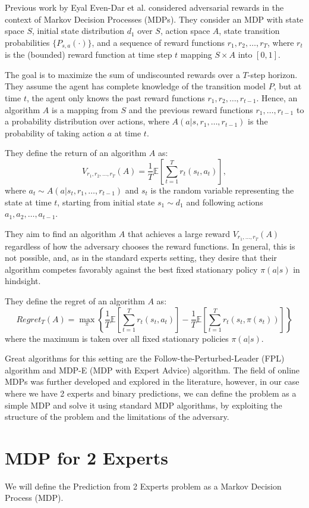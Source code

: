 \documentclass[a4paper, 12pt]{article}
\begin{document}
Previous work by Eyal Even-Dar et al. considered adversarial rewards in the context of Markov Decision Processes (MDPs).
They consider an MDP with state space $S$, initial state distribution $d_1$ over $S$, action space $A$, 
state transition probabilities $\{P_{s,a}(\cdot)\}$, and a sequence of reward functions $r_1, r_2, \ldots, r_T$, 
where $r_t$ is the (bounded) reward function at time step $t$ mapping $S \times A$ into $[0, 1]$.

The goal is to maximize the sum of undiscounted rewards over a $T$-step horizon. 
They assume the agent has complete knowledge of the transition model $P$, but at time $t$, 
the agent only knows the past reward functions $r_1, r_2, \ldots, r_{t-1}$. 
Hence, an algorithm $A$ is a mapping from $S$ and the previous reward functions $r_1, \ldots, r_{t-1}$ to a probability distribution over actions, 
where $A(a|s, r_1, \ldots, r_{t-1})$ is the probability of taking action $a$ at time $t$.

They define the return of an algorithm $A$ as:
\[
V_{r_1, r_2, \ldots, r_T}(A) = \frac{1}{T} \mathbb{E} \left[ \sum_{t=1}^{T} r_t(s_t, a_t) \right],
\]
where $a_t \sim A(a|s_t, r_1, \ldots, r_{t-1})$ and $s_t$ is the random variable representing the state at time $t$, 
starting from initial state $s_1 \sim d_1$ and following actions $a_1, a_2, \ldots, a_{t-1}$.

They aim to find an algorithm $A$ that achieves a large reward $V_{r_1, \ldots, r_T}(A)$ regardless of how the adversary chooses the reward functions. 
In general, this is not possible, and, as in the standard experts setting, they desire that their algorithm competes favorably against the best fixed stationary policy $\pi(a|s)$ in hindsight.

They define the regret of an algorithm $A$ as:
\[
Regret_T(A) = \max_{\pi} \left\{ \frac{1}{T} \mathbb{E} \left[ \sum_{t=1}^{T} r_t(s_t, a_t) \right] - \frac{1}{T} \mathbb{E} \left[ \sum_{t=1}^{T} r_t(s_t, \pi(s_t)) \right] \right\}
\]
where the maximum is taken over all fixed stationary policies $\pi(a|s)$.



Great algorithms for this setting are the Follow-the-Perturbed-Leader (FPL) algorithm and MDP-E (MDP with Expert Advice) algorithm.
The field of online MDPs was further developed and explored in the literature, however, in our case where we have 2 experts and binary predictions,
we can define the problem as a simple MDP and solve it using standard MDP algorithms, by exploiting the structure of the problem and the limitations of the adversary.

\section*{MDP for 2 Experts}

We will define the Prediction from 2 Experts problem as a Markov Decision Process (MDP).
\end{document}
